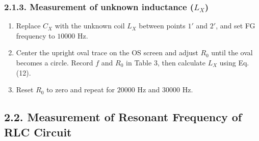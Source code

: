 \documentclass[12pt,oneside,a4paper]{article}
\theoremstyle{definition}
\begin{document}
	\subsubsection*{2.1.3. Measurement of unknown inductance ($L_X$)}
	\begin{enumerate}[leftmargin=1.5em]
		\item Replace $C_X$ with the unknown coil $L_X$ between points $1'$ and $2'$, and set FG frequency to $10000\text{ Hz}$.
		\item Center the upright oval trace on the OS screen and adjust $R_0$ until the oval becomes a circle. Record $f$ and $R_0$ in Table 3, then calculate $L_X$ using Eq. (12).
		\item Reset $R_0$ to zero and repeat for $20000\text{ Hz}$ and $30000\text{ Hz}$.
	\end{enumerate}
	
	\subsection*{2.2. Measurement of Resonant Frequency of RLC Circuit}
\end{document}
